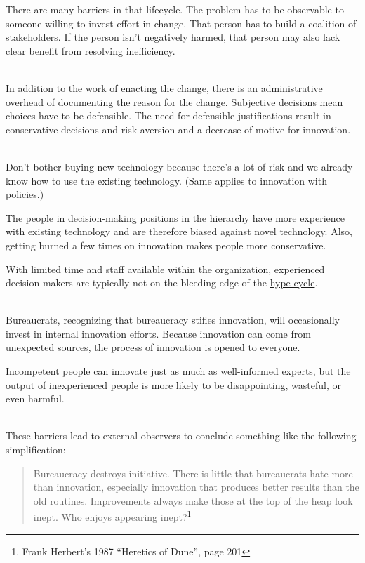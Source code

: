 There are many barriers in that lifecycle. The problem has to be observable to someone willing to invest effort in change. That person has to build a coalition of stakeholders. If the person isn't negatively harmed, that person may also lack clear benefit from resolving inefficiency. 

\ \\

In addition to the work of enacting the change, there is an administrative overhead of documenting the reason for the change. 
Subjective decisions mean choices have to be defensible. 
The need for defensible justifications result in conservative decisions and risk aversion and a decrease of motive for innovation. 

\ \\

Don't bother buying new technology because there's a lot of risk and we already know how to use the existing technology. (Same applies to innovation with policies.)

The people in decision-making positions in the hierarchy have more experience with existing technology and are therefore biased against novel technology. Also, getting burned a few times on innovation makes people more conservative.

With limited time and staff available within the organization, experienced decision-makers are typically not on the bleeding edge of the \href{https://en.wikipedia.org/wiki/Gartner_hype_cycle}{hype cycle}.

\ \\

Bureaucrats, recognizing that bureaucracy stifles innovation, will occasionally invest in internal innovation efforts. Because innovation can come from unexpected sources, the process of innovation is opened to everyone. 

Incompetent people can innovate just as much as well-informed experts, but the output of inexperienced people is more likely to be disappointing, wasteful, or even harmful. 

\ \\

These barriers lead to external observers to conclude something like the following simplification:
\begin{quote}
Bureaucracy destroys initiative. There is little that bureaucrats hate more than innovation, especially innovation that produces better results than the old routines.
Improvements always make those at the top of the heap look inept. Who enjoys appearing inept?\footnote{Frank Herbert's 1987 ``Heretics of Dune'', page 201}%
\end{quote}

